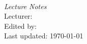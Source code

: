 \begin{titlepage}
  \begin{center}
    \vspace*{\fill}
    \begin{doublespacing}
      {\LARGE\bfseries\notestitle}\\[2\baselineskip] %
    \end{doublespacing}
    {\emph{Lecture Notes}}\\[5cm]
    {Lecturer: \lecturer}\\[0.5\baselineskip]
    {Edited by: \editor}\\[2\baselineskip]
    {Last updated: \today}
    \vspace*{\fill}
  \end{center}
\end{titlepage}
